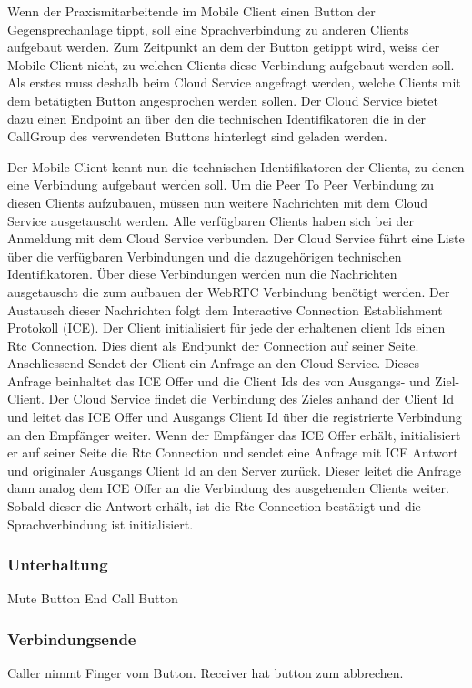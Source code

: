 Wenn der Praxismitarbeitende im Mobile Client einen Button der Gegensprechanlage tippt, soll eine Sprachverbindung zu anderen Clients aufgebaut werden.
Zum Zeitpunkt an dem der Button getippt wird, weiss der Mobile Client nicht, zu welchen Clients diese Verbindung aufgebaut werden soll.
Als erstes muss deshalb beim Cloud Service angefragt werden, welche Clients mit dem betätigten Button angesprochen werden sollen.
Der Cloud Service bietet dazu einen Endpoint an über den die technischen Identifikatoren die in der CallGroup des verwendeten Buttons hinterlegt sind geladen werden.

Der Mobile Client kennt nun die technischen Identifikatoren der Clients, zu denen eine Verbindung aufgebaut werden soll.
Um die Peer To Peer Verbindung zu diesen Clients aufzubauen, müssen nun weitere Nachrichten mit dem Cloud Service ausgetauscht werden.
Alle verfügbaren Clients haben sich bei der Anmeldung mit dem Cloud Service verbunden.
Der Cloud Service führt eine Liste über die verfügbaren Verbindungen und die dazugehörigen technischen Identifikatoren.
Über diese Verbindungen werden nun die Nachrichten ausgetauscht die zum aufbauen der WebRTC Verbindung benötigt werden.
Der Austausch dieser Nachrichten folgt dem Interactive Connection Establishment Protokoll (ICE).
Der Client initialisiert für jede der erhaltenen client Ids einen Rtc Connection.
Dies dient als Endpunkt der Connection auf seiner Seite.
Anschliessend Sendet der Client ein Anfrage an den Cloud Service.
Dieses Anfrage beinhaltet das ICE Offer und die Client Ids des von Ausgangs- und Ziel-Client.
Der Cloud Service findet die Verbindung des Zieles anhand der Client Id und leitet das ICE Offer und Ausgangs Client Id über die registrierte Verbindung an den Empfänger weiter.
Wenn der Empfänger das ICE Offer erhält, initialisiert er auf seiner Seite die Rtc Connection und sendet eine Anfrage mit ICE Antwort und originaler Ausgangs Client Id an den Server zurück.
Dieser leitet die Anfrage dann analog dem ICE Offer an die Verbindung des ausgehenden Clients weiter.
Sobald dieser die Antwort erhält, ist die Rtc Connection bestätigt und die Sprachverbindung ist initialisiert.

\clearpage


\subsubsection*{Unterhaltung}

Mute Button
End Call Button


\subsubsection*{Verbindungsende}

Caller nimmt Finger vom Button.
Receiver hat button zum abbrechen.

\clearpage

